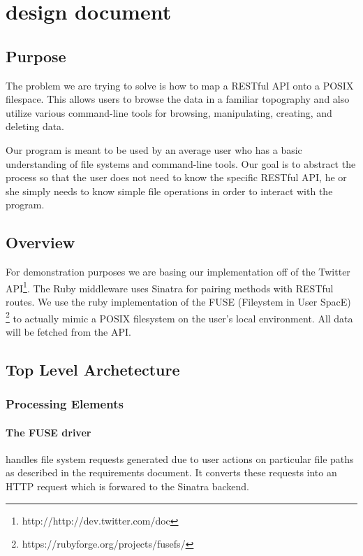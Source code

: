 \section{design document}

\subsection{Purpose}

The problem we are trying to solve is how to map a RESTful API onto a POSIX
filespace. This allows users to browse the data in a familiar topography and
also utilize various command-line tools for browsing, manipulating, creating,
and deleting data. 

Our program is meant to be used by an average user who has a basic understanding
of file systems and command-line tools. Our goal is to abstract the process so
that the user does not need to know the specific RESTful API, he or she simply
needs to know simple file operations in order to interact with the program.

\subsection{Overview}

For demonstration purposes we are basing our implementation off of the Twitter
API\footnote{http://http://dev.twitter.com/doc}. The Ruby middleware uses Sinatra
for pairing methods with RESTful routes. We use the ruby implementation of the
FUSE (Fileystem in User SpacE) \footnote{https://rubyforge.org/projects/fusefs/}
to actually mimic a POSIX filesystem on the user's local environment. All data
will be fetched from the API.

\subsection{Top Level Archetecture}

\subsubsection{Processing Elements}

\paragraph{The FUSE driver} handles file system requests generated due
to user actions on particular file paths as described in the requirements
document. It converts these requests into an HTTP request which is forwared to
the Sinatra backend.


